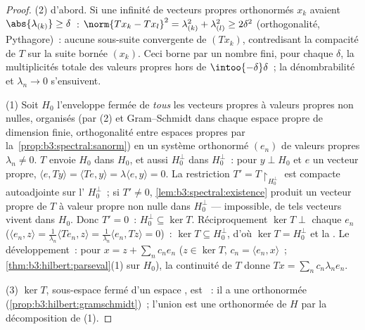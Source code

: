 \begin{proof}
(2) d'abord. Si une infinité de vecteurs propres orthonormés
$x_k$ avaient $\abs{\lambda_{(k)}} \geq \delta$~:
$\norm{Tx_k - Tx_l}^2 = \lambda_{(k)}^2 + \lambda_{(l)}^2
\geq 2\delta^2$ (orthogonalité, Pythagore)~: aucune
sous-suite convergente de $(Tx_k)$, contredisant la
compacité de $T$ sur la suite bornée $(x_k)$. Ceci borne par
un nombre fini, pour chaque $\delta$, la multiplicités
totale des valeurs propres hors de $\intoo{-\delta}\delta$~;
la dénombrabilité et $\lambda_n \to 0$ s'ensuivent.

(1) Soit $H_0$ l'enveloppe fermée de \emph{tous} les vecteurs
propres à valeurs propres non nulles, organisés (par (2) et
Gram--Schmidt dans chaque espace propre de dimension finie,
orthogonalité entre espaces propres par
la~\cref{prop:b3:spectral:sanorm}) en un système orthonormé
$(e_n)$ de valeurs propres $\lambda_n \neq 0$. $T$ envoie
$H_0$ dans $H_0$, et aussi $H_0^\perp$ dans $H_0^\perp$~:
pour $y \perp H_0$ et $e$ un vecteur propre, $\langle e,
Ty\rangle = \langle Te, y\rangle = \lambda\langle e,
y\rangle = 0$. La restriction $T' = T\restriction_{H_0^\perp}$
est compacte autoadjointe sur l'
$H_0^\perp$~; si $T' \neq 0$,
\cref{lem:b3:spectral:existence} produit un vecteur propre
de $T$ à valeur propre non nulle dans $H_0^\perp$ ---
impossible, de tels vecteurs vivent dans $H_0$. Donc $T' =
0$~: $H_0^\perp \subseteq \ker T$. Réciproquement $\ker T
\perp$ chaque $e_n$ ($\langle e_n, z\rangle =
\frac1{\lambda_n}\langle Te_n, z\rangle =
\frac1{\lambda_n}\langle e_n, Tz\rangle = 0$)~: $\ker T
\subseteq H_0^\perp$, d'où $\ker T = H_0^\perp$ et la
. Le développement~: pour $x = z +
\sum_nc_ne_n$ ($z \in \ker T$, $c_n = \langle e_n,
x\rangle$~; \cref{thm:b3:hilbert:parseval}(1) sur $H_0$),
la continuité de $T$ donne $Tx = \sum_nc_n\lambda_ne_n$.

(3) $\ker T$, sous-espace fermé d'un espace , est
~: il a une  orthonormée
(\cref{prop:b3:hilbert:gramschmidt})~; l'union est une 
orthonormée de $H$ par la décomposition de (1).
\end{proof}

